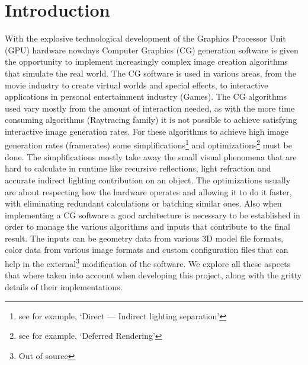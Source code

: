 \section{Introduction}
With the explosive technological development of the Graphics Processor Unit (GPU) hardware nowdays
Computer Graphics (CG) generation software is given the opportunity to implement increasingly complex image
creation algorithms that simulate the real world. The CG software is used in various areas, from the movie
industry to create virtual worlds and special effects, to interactive applications in personal entertainment
industry (Games). The CG algorithms used vary mostly from the amount of interaction needed, as with the more
time consuming algorithms (Raytracing family) it is not possible to achieve satisfying interactive image
generation rates. For these algorithms to achieve high image generation rates (framerates) some
simplifications\footnote{see for example, `Direct --- Indirect lighting separation'} and optimizations\footnote{see
for example, `Deferred Rendering'} must be done. The simplifications mostly take away the small visual phenomena
that are hard to calculate in runtime like recursive reflections, light refraction and accurate indirect lighting
contribution on an object. The optimizations usually are about respecting how the hardware operates and allowing
it to do it faster, with eliminating redundant calculations or batching similar ones. Also when implementing a
CG software a good architecture is necessary to be established in order to manage the various algorithms and
inputs that contribute to the final result. The inputs can be geometry data from various 3D model file formats,
color data from various image formats and custom configuration files that can help in the external\footnote{Out of
source} modification of the software. We explore all these aspects that where taken into account when developing
this project, along with the gritty details of their implementations.
